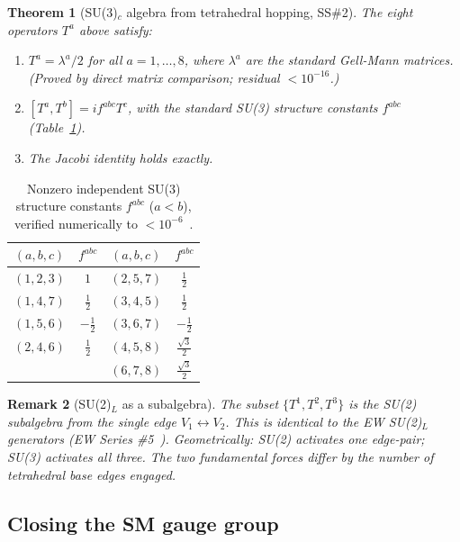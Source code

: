 \documentclass[11pt,a4paper]{article}
\newtheorem{theorem}{Theorem}[section]
\newtheorem{remark}[theorem]{Remark}
\begin{document}
\begin{theorem}[SU(3)$_c$ algebra from tetrahedral hopping, SS\#2]
\label{thm:su3}
The eight operators $T^a$ above satisfy:
\begin{enumerate}
\item $T^a = \lambda^a/2$ for all $a = 1,\ldots,8$, where
  $\lambda^a$ are the standard Gell-Mann matrices.
  (Proved by direct matrix comparison; residual $< 10^{-16}$.)
\item $[T^a, T^b] = if^{abc}T^c$, with the standard SU(3)
  structure constants $f^{abc}$ (Table~\ref{tab:fconst}).
\item The Jacobi identity holds exactly.
\end{enumerate}
\end{theorem}

\begin{table}[H]
\centering
\caption{Nonzero independent SU(3) structure constants $f^{abc}$
  ($a<b$), verified numerically to $<10^{-6}$~\citep{cpp_ss_mc}.}
\label{tab:fconst}
\begin{tabular}{@{}cccc@{}}
\toprule
$(a,b,c)$ & $f^{abc}$ & $(a,b,c)$ & $f^{abc}$ \\
\midrule
$(1,2,3)$ & $1$ & $(2,5,7)$ & $\tfrac{1}{2}$ \\
$(1,4,7)$ & $\tfrac{1}{2}$ & $(3,4,5)$ & $\tfrac{1}{2}$ \\
$(1,5,6)$ & $-\tfrac{1}{2}$ & $(3,6,7)$ & $-\tfrac{1}{2}$ \\
$(2,4,6)$ & $\tfrac{1}{2}$ & $(4,5,8)$ & $\tfrac{\sqrt{3}}{2}$ \\
& & $(6,7,8)$ & $\tfrac{\sqrt{3}}{2}$ \\
\bottomrule
\end{tabular}
\end{table}

\begin{remark}[SU(2)$_L$ as a subalgebra]
The subset $\{T^1,T^2,T^3\}$ is the SU(2) subalgebra from the
single edge $V_1\leftrightarrow V_2$.  This is identical to the
EW SU(2)$_L$ generators (EW Series \#5~\citep{cpp_ew5}).
Geometrically: SU(2) activates one edge-pair; SU(3) activates all
three.  The two fundamental forces differ by the number of
tetrahedral base edges engaged.
\end{remark}

\subsection{Closing the SM gauge group}
\end{document}
